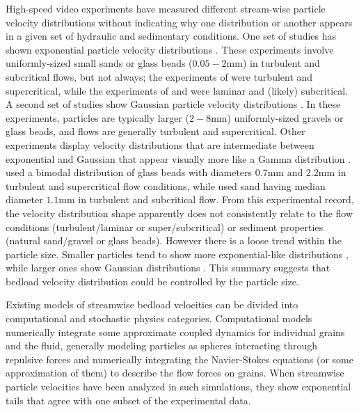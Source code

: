 High-speed video experiments have measured different stream-wise particle velocity distributions without indicating why one distribution or another appears in a given set of hydraulic and sedimentary conditions.
One set of studies has shown exponential particle velocity distributions \citep{Charru2004,Lajeunesse2010,Roseberry2012,Seizilles2014,Fathel2015,Fathel2016}.
These experiments involve uniformly-sized small sands or glass beads ($0.05-2$mm) in turbulent and subcritical flows, but not always; the experiments of \citet{Lajeunesse2010} were turbulent and supercritical, while the experiments of \citet{Charru2004} and \citet{Seizilles2014} were laminar and (likely) subcritical.
A second set of studies show Gaussian particle velocity distributions \citep{Ancey2014,Heyman2016,Martin2012}. In these experiments, particles are typically larger ($2-8$mm) uniformly-sized gravels or glass beads, and flows are generally turbulent and supercritical.
Other experiments display velocity distributions that are intermediate between exponential and Gaussian that appear visually more like a Gamma distribution \citep{Houssais2012, Liu2019}.
\citet{Houssais2012} used a bimodal distribution of glass beads with diameters $0.7$mm and $2.2$mm in turbulent and supercritical flow conditions, while \citet{Liu2019} used sand having median diameter $1.1$mm in turbulent and subcritical flow.
From this experimental record, the velocity distribution shape apparently does not consistently relate to the flow conditions (turbulent/laminar or super/subcritical) or sediment properties (natural sand/gravel or glass beads).
However there is a loose trend within the particle size.
Smaller particles tend to show more exponential-like distributions \citep[e.g.][]{Fathel2015}, while larger ones show Gaussian distributions \citep[e.g.][]{Heyman2016}. This summary suggests that bedload velocity distribution could be controlled by the particle size.

Existing models of streamwise bedload velocities can be divided into computational and stochastic physics categories.
Computational models numerically integrate some approximate coupled dynamics for individual grains and the fluid, generally modeling particles as spheres interacting through repulsive forces and numerically integrating the Navier-Stokes equations (or some approximation of them) to describe the flow forces on grains.
When streamwise particle velocities have been analyzed in such simulations, they show exponential tails \citep{Gonzalez2017,Furbish2013} that agree with one subset of the experimental data.

